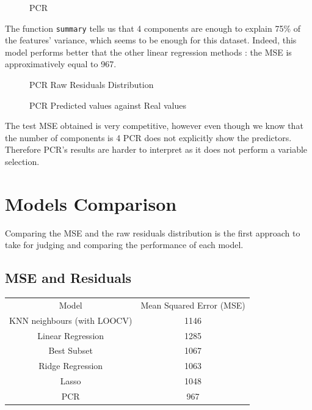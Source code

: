 \documentclass[]{report}
\newcommand{\inputtikz}[2]{%
	\scalebox{#1}{}  
}
\begin{document}
\begin{figure}[!h]
	\centering
	\inputtikz{0.5}{Figures/pcr_cv.tex}
	\caption{PCR}
	\label{fig:pcr_cv}
\end{figure}

The function \texttt{summary} tells us that 4 components are enough to explain 75\% of the features' variance, which seems to be enough for this dataset. Indeed, this model performs better that the other linear regression methods : the MSE is approximatively equal to 967. 

\begin{figure}[!h]
	\centering
	\inputtikz{0.5}{Figures/pcr_hist.tex}
	\caption{PCR Raw Residuals Distribution}
	\label{fig:pcr_hist}
\end{figure}

\begin{figure}[!h]
	\centering
	\inputtikz{0.5}{Figures/pcr_predicted.tex}
	\caption{PCR Predicted values against Real values}
	\label{fig:pcr_predicted}
\end{figure}
The test MSE obtained is very competitive, however even though we know that the number of components is 4 PCR does not explicitly show the predictors. Therefore PCR's results are harder to interpret as it does not perform a variable selection.

\section{Models Comparison}
Comparing the MSE and the raw residuals distribution is the first approach to take for judging and comparing the performance of each model.\\
\subsection{MSE and Residuals}
\begin{center}
\begin{tabular}{c c}
	Model & Mean Squared Error (MSE) \\
	KNN neighbours (with LOOCV) & 1146\\ 
	Linear Regression & 1285\\
	Best Subset	& 1067\\
	Ridge Regression & 1063 \\	
	Lasso & 1048\\
	PCR & 967 \\
\end{tabular}
\end{center}
\end{document}
